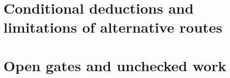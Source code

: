 \documentclass[11pt]{article}
\theoremstyle{remark}\newtheorem{remark}[theorem]{Remark}
\begin{document}















\part{Conditional deductions and limitations of alternative routes}


\part{Open gates and unchecked work}
\end{document}
